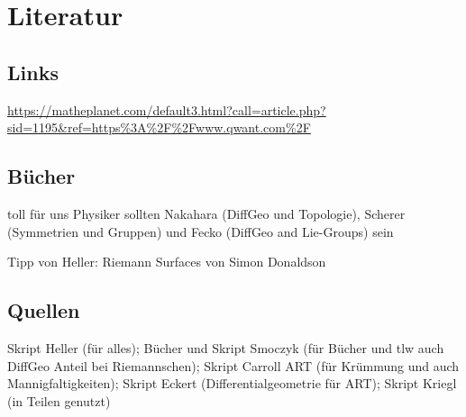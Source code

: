 




\newpage


	\section{Literatur}
		\subsection{Links}
\url{https://matheplanet.com/default3.html?call=article.php?sid=1195\&ref=https\%3A\%2F\%2Fwww.qwant.com\%2F}

		\subsection{Bücher}
toll für uns Physiker sollten Nakahara (DiffGeo und Topologie), Scherer (Symmetrien und Gruppen) und Fecko (DiffGeo and Lie-Groups) sein


Tipp von Heller: Riemann Surfaces von Simon Donaldson



		\subsection{Quellen}
Skript Heller (für alles); Bücher und Skript Smoczyk (für Bücher und tlw auch DiffGeo Anteil bei Riemannschen); Skript Carroll ART (für Krümmung und auch Mannigfaltigkeiten); Skript Eckert (Differentialgeometrie für ART); Skript Kriegl (in Teilen genutzt)


\newpage
{}
\printindex

 